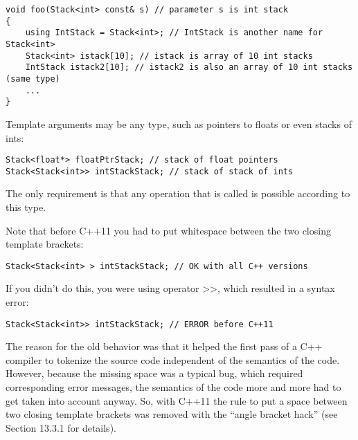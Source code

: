 \begin{lstlisting}[style=styleCXX]
void foo(Stack<int> const& s) // parameter s is int stack
{
	using IntStack = Stack<int>; // IntStack is another name for Stack<int>
	Stack<int> istack[10]; // istack is array of 10 int stacks
	IntStack istack2[10]; // istack2 is also an array of 10 int stacks (same type)
	...
}
\end{lstlisting}

Template arguments may be any type, such as pointers to floats or even stacks of ints:

\begin{lstlisting}[style=styleCXX]
Stack<float*> floatPtrStack; // stack of float pointers
Stack<Stack<int>> intStackStack; // stack of stack of ints
\end{lstlisting}

The only requirement is that any operation that is called is possible according to this type.

Note that before C++11 you had to put whitespace between the two closing template brackets:

\begin{lstlisting}[style=styleCXX]
Stack<Stack<int> > intStackStack; // OK with all C++ versions
\end{lstlisting}

If you didn’t do this, you were using operator >>, which resulted in a syntax error:

\begin{lstlisting}[style=styleCXX]
Stack<Stack<int>> intStackStack; // ERROR before C++11
\end{lstlisting}

The reason for the old behavior was that it helped the first pass of a C++ compiler to tokenize the source code independent of the semantics of the code. However, because the missing space was a typical bug, which required corresponding error messages, the semantics of the code more and more had to get taken into account anyway. So, with C++11 the rule to put a space between two closing template brackets was removed with the “angle bracket hack” (see Section 13.3.1 for details).





















